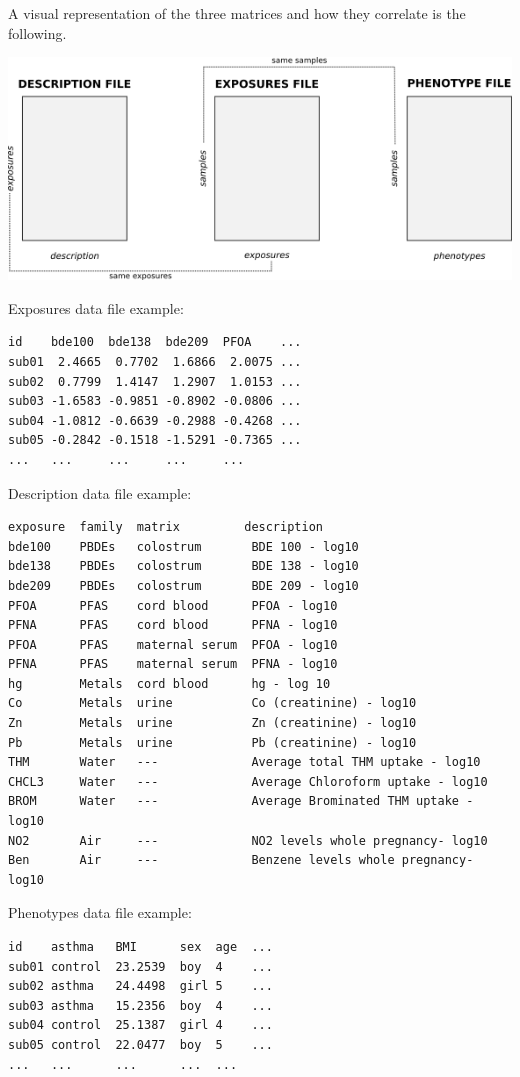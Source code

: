 \documentclass[
]{book}
\begin{document}
A visual representation of the three matrices and how they correlate is the following.

\includegraphics{images/exposome_dataset_struct.png}

Exposures data file example:

\begin{verbatim}
id    bde100  bde138  bde209  PFOA    ...
sub01  2.4665  0.7702  1.6866  2.0075 ...
sub02  0.7799  1.4147  1.2907  1.0153 ...  
sub03 -1.6583 -0.9851 -0.8902 -0.0806 ... 
sub04 -1.0812 -0.6639 -0.2988 -0.4268 ... 
sub05 -0.2842 -0.1518 -1.5291 -0.7365 ... 
...   ...     ...     ...     ...
\end{verbatim}

Description data file example:

\begin{verbatim}
exposure  family  matrix         description
bde100    PBDEs   colostrum       BDE 100 - log10
bde138    PBDEs   colostrum       BDE 138 - log10
bde209    PBDEs   colostrum       BDE 209 - log10
PFOA      PFAS    cord blood      PFOA - log10
PFNA      PFAS    cord blood      PFNA - log10
PFOA      PFAS    maternal serum  PFOA - log10
PFNA      PFAS    maternal serum  PFNA - log10
hg        Metals  cord blood      hg - log 10
Co        Metals  urine           Co (creatinine) - log10
Zn        Metals  urine           Zn (creatinine) - log10
Pb        Metals  urine           Pb (creatinine) - log10
THM       Water   ---             Average total THM uptake - log10
CHCL3     Water   ---             Average Chloroform uptake - log10
BROM      Water   ---             Average Brominated THM uptake - log10
NO2       Air     ---             NO2 levels whole pregnancy- log10
Ben       Air     ---             Benzene levels whole pregnancy- log10
\end{verbatim}

Phenotypes data file example:

\begin{verbatim}
id    asthma   BMI      sex  age  ...
sub01 control  23.2539  boy  4    ...
sub02 asthma   24.4498  girl 5    ...
sub03 asthma   15.2356  boy  4    ...
sub04 control  25.1387  girl 4    ...
sub05 control  22.0477  boy  5    ...
...   ...      ...      ...  ...
\end{verbatim}
\end{document}

